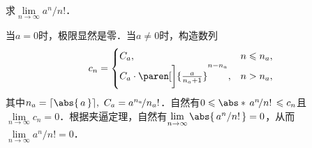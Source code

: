 \begin{example}
  \label{eg:factexp}
  求\(\lim\limits_{n\to\infty} {a^n}\!/{n!}\)． %

  \begin{remark}
    当\(a = 0\)时，极限显然是零．当\(a \ne 0\)时，构造数列
    \begin{equation*}
      c_n =
      \begin{cases}
        C_a, & n \le n_a, \\
        C_a \cdot \paren[\bigg]{\frac{a}{n_a + 1}}^{n-n_a}, & n > n_a,
      \end{cases}
    \end{equation*}
    其中\(n_a = \ceil{\abs{\,a\,}},\ C_a = a^{n_a}\!/n_a!\)．自然有\(0 \le \abs*{\,a^n\!/n!\,} \le c_n\)且\(\lim\limits_{n\to\infty} c_n = 0\)．根据夹逼定理，自然有\(\lim\limits_{n\to\infty} \abs{\,a^n/n!\,} = 0\)，从而\(\lim\limits_{n\to\infty} a^n/n! = 0\)．
  \end{remark}


\end{example}

